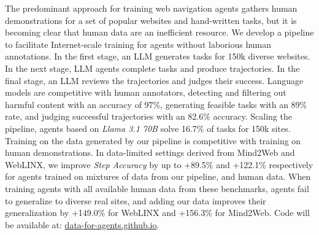 The predominant approach for training web navigation agents gathers human demonstrations for a set of popular websites and hand-written tasks, but it is becoming clear that human data are an inefficient resource. We develop a pipeline to facilitate Internet-scale training for agents without laborious human annotations. In the first stage, an LLM generates tasks for 150k diverse websites. In the next stage, LLM agents complete tasks and produce trajectories. In the final stage, an LLM reviews the trajectories and judges their success. Language models are competitive with human annotators, detecting and filtering out harmful content with an accuracy of 97\%, generating feasible tasks with an 89\% rate, and judging successful trajectories with an 82.6\% accuracy. Scaling the pipeline, agents based on \textit{Llama 3.1 70B} solve 16.7\% of tasks for 150k sites. Training on the data generated by our pipeline is competitive with training on human demonstrations. In data-limited settings derived from Mind2Web and WebLINX, we improve \textit{Step Accuracy} by up to +89.5\% and +122.1\% respectively for agents trained on mixtures of data from our pipeline, and human data. When training agents with all available human data from these benchmarks, agents fail to generalize to diverse real sites, and adding our data improves their generalization by +149.0\% for WebLINX and +156.3\% for Mind2Web. Code will be available at: \href{https://data-for-agents.github.io}{data-for-agents.github.io}.

